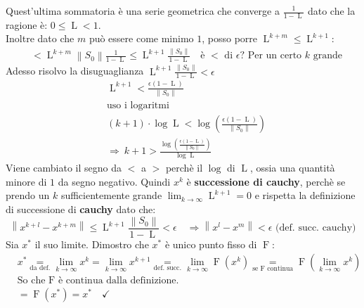\documentclass{article}
\begin{document}
Quest'ultima sommatoria è una serie geometrica che converge a $\frac{1}{1-\operatorname{L}}$ dato che la ragione è: $0\le\operatorname{L}<1$.\\
Inoltre dato che $m$ può essere come minimo $1$, posso porre $\operatorname{L}^{k+m}\le\operatorname{L}^{k+1}$:
\begin{align*}
     & <\operatorname{L}^{k+m}\left\|S_0\right\|\frac{1}{1-\operatorname{L}}\le\operatorname{L}^{k+1}\frac{\left\|S_0\right\|}{1-\operatorname{L}}\quad\text{è $<$ di $\epsilon$? Per un certo $k$ grande}
\end{align*}
Adesso risolvo la disuguaglianza $\operatorname{L}^{k+1}\frac{\left\|S_0\right\|}{1-\operatorname{L}}<\epsilon$
\begin{align*}
     & \operatorname{L}^{k+1}<\frac{\epsilon(1-\operatorname{L})}{\left\|S_0\right\|}                                         \\
     & \text{uso i logaritmi}                                                                                                 \\
     & (k+1)\cdot\log\operatorname{L}<\log\left(\frac{\epsilon(1-\operatorname{L})}{\left\|S_0\right\|}\right)                \\
     & \Rightarrow\ k+1>\frac{\log\left(\frac{\epsilon(1-\operatorname{L})}{\left\|S_0\right\|}\right)}{\log\operatorname{L}}
\end{align*}
Viene cambiato il segno da $<$ a $>$ perchè il $\log$ di $\operatorname{L}$, ossia una quantità minore di $1$ da segno negativo.
Quindi $x^k$ è \textbf{successione di cauchy}, perchè se prendo un $k$ sufficientemente grande $\lim_{k\to\infty}\operatorname{L}^{k+1}=0$ e rispetta la
definizione di successione di \textbf{cauchy} dato che:
\[\left\|x^{k+l}-x^{k+m}\right\|\le\operatorname{L}^{k+1}\frac{\left\|S_0\right\|}{1-\operatorname{L}}<\epsilon\quad\Rightarrow \left\|x^l-x^m\right\|<\epsilon\text{ (def. succ. cauchy)}\]
Sia $x^\ast$ il suo limite. Dimostro che $x^\ast$ è unico punto fisso di $\operatorname{F}$:
\begin{align*}
     & x^\ast\underset{\text{da def.}}{=}\lim_{k\to\infty}x^k=\lim_{k\to\infty}x^{k+1}\underset{\text{def. succ.}}{=}\lim_{k\to\infty}\operatorname{F}(x^k)\underset{\text{se }\operatorname{F}\text{ continua}}{=}\operatorname{F}\left(\lim_{k\to\infty}x^k\right) \\
     & \text{So che $\operatorname{F}$ è continua dalla definizione.}                                                                                                                                                                                                \\
     & =\operatorname{F}\left(x^\ast\right)=x^\ast\quad\checkmark
\end{align*}
\end{document}
